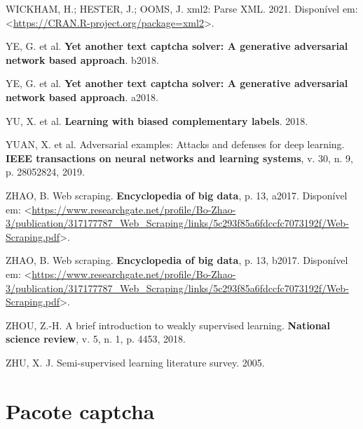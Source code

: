 \documentclass[12pt,twoside,brazilian]{book}
\newlength{\cslhangindent}
\newlength{\cslentryspacingunit} %
\newenvironment{CSLReferences}[2] %
 {%
  \setlength{\parindent}{0pt}
  \ifodd #1
  \let\oldpar\par
  \def\par{\hangindent=\cslhangindent\oldpar}
  \fi
  \setlength{\parskip}{#2\cslentryspacingunit}
 }%
 {}
\begin{document}
\begin{CSLReferences}{0}{1}
\leavevmode{}%
WICKHAM, H.; HESTER, J.; OOMS, J. xml2: Parse XML. 2021. Disponível em:
\textless{}\url{https://CRAN.R-project.org/package=xml2}\textgreater.

\leavevmode{}%
YE, G. et al. \textbf{Yet another text captcha solver: A generative
adversarial network based approach}. b2018.

\leavevmode{}%
YE, G. et al. \textbf{Yet another text captcha solver: A generative
adversarial network based approach}. a2018.

\leavevmode{}%
YU, X. et al. \textbf{Learning with biased complementary labels}. 2018.

\leavevmode{}%
YUAN, X. et al. Adversarial examples: Attacks and defenses for deep
learning. \textbf{IEEE transactions on neural networks and learning
systems}, v. 30, n. 9, p. 28052824, 2019.

\leavevmode{}%
ZHAO, B. Web scraping. \textbf{Encyclopedia of big data}, p. 13, a2017.
Disponível em:
\textless{}\url{https://www.researchgate.net/profile/Bo-Zhao-3/publication/317177787_Web_Scraping/links/5c293f85a6fdccfc7073192f/Web-Scraping.pdf}\textgreater.

\leavevmode{}%
ZHAO, B. Web scraping. \textbf{Encyclopedia of big data}, p. 13, b2017.
Disponível em:
\textless{}\url{https://www.researchgate.net/profile/Bo-Zhao-3/publication/317177787_Web_Scraping/links/5c293f85a6fdccfc7073192f/Web-Scraping.pdf}\textgreater.

\leavevmode{}%
ZHOU, Z.-H. A brief introduction to weakly supervised learning.
\textbf{National science review}, v. 5, n. 1, p. 4453, 2018.

\leavevmode{}%
ZHU, X. J. Semi-supervised learning literature survey. 2005.

\end{CSLReferences}

\appendix
{}

\hypertarget{sec-pacote}{%
\chapter{Pacote captcha}\label{sec-pacote}}
\end{document}
